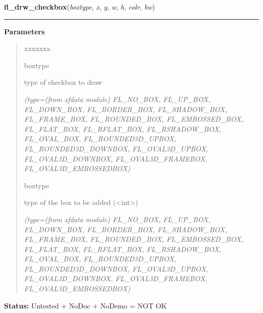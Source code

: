     \label{xformslib:library:fl_drw_checkbox}

    \vspace{0.5ex}

\hspace{.8\funcindent}\begin{boxedminipage}{\funcwidth}

    \raggedright \textbf{fl\_drw\_checkbox}(\textit{boxtype}, \textit{x}, \textit{y}, \textit{w}, \textit{h}, \textit{colr}, \textit{bw})

    \vspace{-1.5ex}

    \rule{\textwidth}{0.5\fboxrule}
\setlength{\parskip}{2ex}
\setlength{\parskip}{1ex}
      \textbf{Parameters}
      \vspace{-1ex}

      \begin{quote}
        \begin{Ventry}{xxxxxxx}

          \item[boxtype]

          type of checkbox to draw

            {\it (type=(from xfdata module) FL\_NO\_BOX, FL\_UP\_BOX, FL\_DOWN\_BOX, 
FL\_BORDER\_BOX, FL\_SHADOW\_BOX, FL\_FRAME\_BOX, FL\_ROUNDED\_BOX, 
FL\_EMBOSSED\_BOX, FL\_FLAT\_BOX, FL\_RFLAT\_BOX, FL\_RSHADOW\_BOX, 
FL\_OVAL\_BOX, FL\_ROUNDED3D\_UPBOX, FL\_ROUNDED3D\_DOWNBOX, 
FL\_OVAL3D\_UPBOX, FL\_OVAL3D\_DOWNBOX, FL\_OVAL3D\_FRAMEBOX, 
FL\_OVAL3D\_EMBOSSEDBOX)}

          \item[boxtype]

          type of the box to be added ({\textless}int{\textgreater})

            {\it (type=(from xfdata module) FL\_NO\_BOX, FL\_UP\_BOX, FL\_DOWN\_BOX, 
FL\_BORDER\_BOX, FL\_SHADOW\_BOX, FL\_FRAME\_BOX, FL\_ROUNDED\_BOX, 
FL\_EMBOSSED\_BOX, FL\_FLAT\_BOX, FL\_RFLAT\_BOX, FL\_RSHADOW\_BOX, 
FL\_OVAL\_BOX, FL\_ROUNDED3D\_UPBOX, FL\_ROUNDED3D\_DOWNBOX, 
FL\_OVAL3D\_UPBOX, FL\_OVAL3D\_DOWNBOX, FL\_OVAL3D\_FRAMEBOX, 
FL\_OVAL3D\_EMBOSSEDBOX)}

        \end{Ventry}

      \end{quote}

\textbf{Status:} Untested + NoDoc + NoDemo = NOT OK



    \end{boxedminipage}

